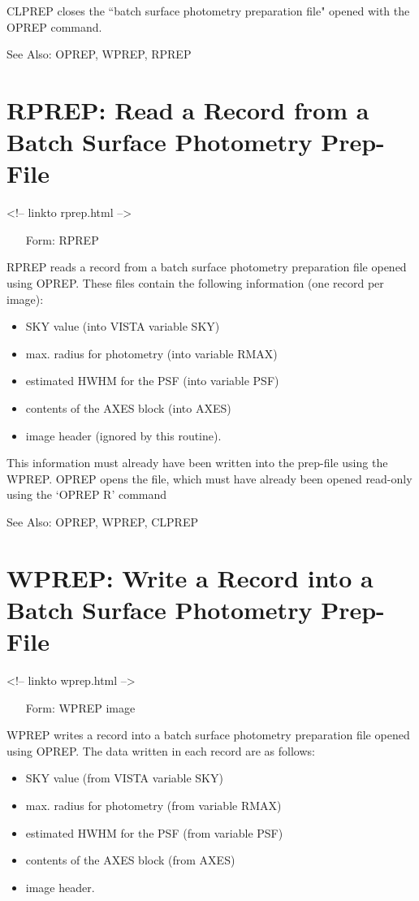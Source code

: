 CLPREP closes the ``batch surface photometry preparation file" opened with
the OPREP command.

See Also:  OPREP, WPREP, RPREP


\section{RPREP: Read a Record from a Batch Surface Photometry Prep-File}
\begin{rawhtml}
<!-- linkto rprep.html -->
\end{rawhtml}
\begin{itemize}
  \item[Form: RPREP\hfill]{}
\end{itemize}

RPREP reads a record from a batch surface photometry preparation file
opened using OPREP.  These files contain the following information (one
record per image):
\begin{itemize}
  \item{SKY value (into VISTA variable SKY)}
  \item{max. radius for photometry (into variable RMAX)}
  \item{estimated HWHM for the PSF (into variable PSF)}
  \item{contents of the AXES block (into AXES)}
  \item{image header (ignored by this routine).}
\end{itemize}

This information must already have been written into the prep-file using
the WPREP.  OPREP opens the file, which must have already been opened
read-only using the `OPREP R' command

See Also:  OPREP, WPREP, CLPREP


\section{WPREP: Write a Record into a Batch Surface Photometry Prep-File}
\begin{rawhtml}
<!-- linkto wprep.html -->
\end{rawhtml}
\begin{itemize}
  \item[Form: WPREP image\hfill]{}
\end{itemize}

WPREP writes a record into a batch surface photometry preparation file
opened using OPREP.  The data written in each record are as follows:
\begin{itemize}
  \item{SKY value (from VISTA variable SKY)}
  \item{max. radius for photometry (from variable RMAX)}
  \item{estimated HWHM for the PSF (from variable PSF)}
  \item{contents of the AXES block (from AXES)}
  \item{image header.}
\end{itemize}

